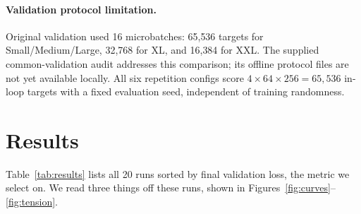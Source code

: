 \documentclass[12pt]{article}
\begin{document}
\paragraph{Validation protocol limitation.}
Original validation used 16 microbatches: 65{,}536 targets for Small/Medium/Large,
32{,}768 for XL, and 16{,}384 for XXL. The supplied common-validation audit addresses
this comparison; its offline protocol files are not yet available locally. All six
repetition configs score $4\times64\times256=65{,}536$ in-loop targets with a fixed
evaluation seed, independent of training randomness.

\section{Results}\label{sec:results}
Table~\ref{tab:results} lists all 20 runs sorted by final validation loss, the metric
we select on. We read three things off these runs, shown in
Figures~\ref{fig:curves}--\ref{fig:tension}.
\end{document}
